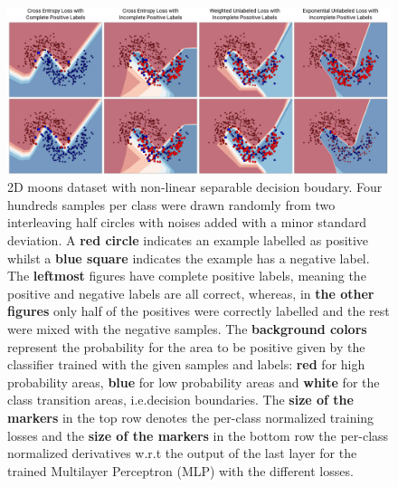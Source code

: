 \begin{figure}
\begin{center}
   \includegraphics[width=0.95\linewidth]{img/moons.png}
\end{center}
   \caption{2D moons dataset with non-linear separable decision boudary. Four hundreds samples per class were drawn randomly from two interleaving half circles with noises added with a minor standard deviation. A \textbf{red circle} indicates an example labelled as positive whilst a \textbf{blue square} indicates the example has a negative label. The \textbf{leftmost} figures have complete positive labels, meaning the positive and negative labels are all correct, whereas, in \textbf{the other figures} only half of the positives were correctly labelled and the rest were mixed with the negative samples. The \textbf{background colors} represent the probability for the area to be positive given by the classifier trained with the given samples and labels: \textbf{red} for high probability areas, \textbf{blue} for low probability areas and \textbf{white} for the class transition areas, i.e.decision boundaries. The \textbf{size of the markers} in the top row denotes the per-class normalized training losses and the \textbf{size of the markers} in the bottom row the per-class normalized derivatives w.r.t the output of the last layer for the trained Multilayer Perceptron (MLP) with the different losses.}
\label{fig:moons}
\end{figure}


